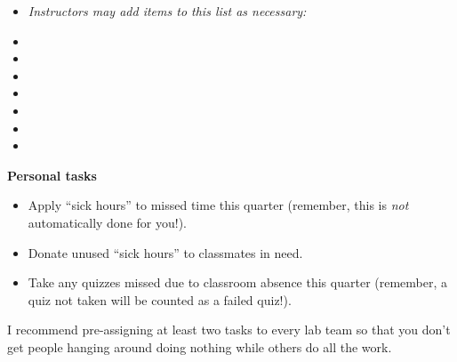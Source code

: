 \filbreak

\begin{itemize}
\item{} {\it Instructors may add items to this list as necessary:}
\vskip 10pt
\item{} \underbar{\hskip 50pt} 
\vskip 10pt
\item{} \underbar{\hskip 50pt} 
\vskip 10pt
\item{} \underbar{\hskip 50pt} 
\vskip 10pt
\item{} \underbar{\hskip 50pt} 
\vskip 10pt
\item{} \underbar{\hskip 50pt} 
\vskip 10pt
\item{} \underbar{\hskip 50pt} 
\vskip 10pt
\item{} \underbar{\hskip 50pt} 
\end{itemize}


\filbreak

\noindent
{\bf Personal tasks}

\begin{itemize}
\item{} Apply ``sick hours'' to missed time this quarter (remember, this is {\it not} automatically done for you!).
\item{} Donate unused ``sick hours'' to classmates in need.
\item{} Take any quizzes missed due to classroom absence this quarter (remember, a quiz not taken will be counted as a failed quiz!).
\end{itemize}







 






I recommend pre-assigning at least two tasks to every lab team so that you don't get people hanging around doing nothing while others do all the work.




